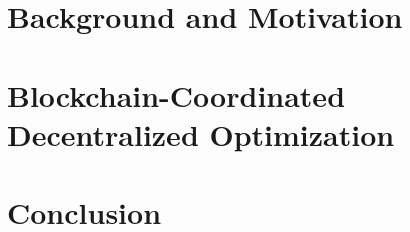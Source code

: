 \documentclass[oldfontcommands]{ucbthesis}
\begin{document}
\chapter{Background and Motivation}\label{chap:background}
%
%
%

\chapter{Blockchain-Coordinated Decentralized Optimization}\label{chap:blockchains}
%
%
%


\chapter{Conclusion}\label{chap:conclusion}



%
%


%

\end{document}
